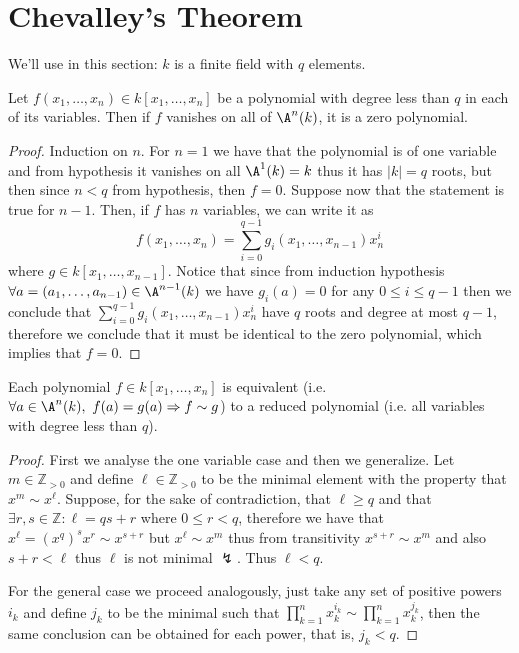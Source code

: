 \section{Chevalley's Theorem}

\begin{remark}
    We'll use in this section: \(k\) is a finite field with \(q\) elements.
\end{remark}


\begin{lemma}
    Let \(f(x_1,\dots,x_n) \in k[x_1, \dots, x_n]\) be a polynomial with degree
    less than  \(q\) in each of its variables. Then if \(f\) vanishes on all of
    \(\A^n(k)\), it is a zero polynomial.
\end{lemma}

\begin{proof}
    Induction on \(n\). For \(n = 1\) we have that the polynomial is of one
    variable and from hypothesis it vanishes on all \(\A^1(k) = k\) thus it has
    \(|k| = q \) roots, but then since \(n < q\) from hypothesis, then \(f = 0\).
    Suppose now that the statement is true for \(n-1\). Then, if \(f\) has \(n\)
    variables, we can write it as
    \[
        f(x_1, \dots, x_n) = \sum_{i=0}^{q-1} g_i(x_1, \dots, x_{n-1}) x_n^i
    \]
    where \(g \in k[x_1, \dots, x_{n-1}]\). Notice that since from induction
    hypothesis \(\forall a = (a_1, \dots, a_{n-1}) \in \A^{n-1}(k)\) we have
    \(g_i(a) = 0\) for any \(0 \leqslant i \leqslant q-1\) then we conclude that
    \(\sum_{i=0}^{q-1}g_i(x_1,\dots,x_{n-1})x_n^i\) have \(q\) roots and  degree
    at most \(q-1\), therefore we conclude that it must be identical to the zero
    polynomial, which implies that \(f = 0\).
\end{proof}

\begin{lemma}
    Each polynomial \(f \in k[x_1, \dots, x_n]\) is equivalent (i.e. \(\forall a
    \in \A^n(k),\ f(a) = g(a) \Rightarrow f \sim g\)) to a reduced polynomial
    (i.e. all variables with degree less than \(q\)).
\end{lemma}

\begin{proof}
    First we analyse the one variable case and then we generalize. Let \(m  \in
    \mathbb{Z}_{> 0}\) and define \(\ell \in \mathbb{Z}_{>0}\) to be the minimal
    element with the property that \(x^m \sim x^\ell\). Suppose, for the sake of
    contradiction, that \(\ell \geqslant q\) and that \(\exists r,s \in
    \mathbb{Z} : \ell = qs + r\) where \(0 \leqslant r < q\), therefore we have
    that \( x^\ell = (x^q)^sx^r \sim x^{s+r}\) but \(x^\ell \sim x^m\) thus from
    transitivity \(x^{s+r} \sim x^m\) and also  \(s+r < \ell\) thus  \(\ell\) is
    not minimal \(\lightning\). Thus \(\ell < q\).

    For the general case we proceed analogously, just take any set of positive
    powers \(i_k\) and define \(j_k\) to be the minimal such that \(\prod_{k=1}^n
    x_k^{i_k} \sim \prod_{k=1}^n x_k^{j_k}\), then the same conclusion can be
    obtained for each power, that is, \(j_k < q\).
\end{proof}

